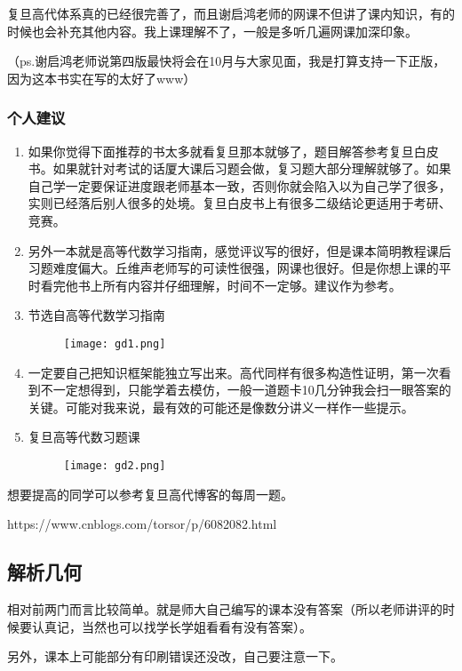 \documentclass{my_paper}
\begin{document}
复旦高代体系真的已经很完善了，而且谢启鸿老师的网课不但讲了课内知识，有的时候也会补充其他内容。我上课理解不了，一般是多听几遍网课加深印象。

（ps.谢启鸿老师说第四版最快将会在10月与大家见面，我是打算支持一下正版，因为这本书实在写的太好了www）

\subsubsection{个人建议}
\begin{enumerate}
    \item 如果你觉得下面推荐的书太多就看复旦那本就够了，题目解答参考复旦白皮书。如果就针对考试的话厦大课后习题会做，复习题大部分理解就够了。如果自己学一定要保证进度跟老师基本一致，否则你就会陷入以为自己学了很多，实则已经落后别人很多的处境。复旦白皮书上有很多二级结论更适用于考研、竞赛。
    \item 另外一本就是高等代数学习指南，感觉评议写的很好，但是课本简明教程课后习题难度偏大。丘维声老师写的可读性很强，网课也很好。但是你想上课的平时看完他书上所有内容并仔细理解，时间不一定够。建议作为参考。
    \item  节选自高等代数学习指南
    \begin{figure}[H]
	\centering
	\texttt{[image: gd1.png]}
    \end{figure} 
    \item 	一定要自己把知识框架能独立写出来。高代同样有很多构造性证明，第一次看到不一定想得到，只能学着去模仿，一般一道题卡10几分钟我会扫一眼答案的关键。可能对我来说，最有效的可能还是像数分讲义一样作一些提示。
    \item   复旦高等代数习题课
    \begin{figure}[H]
	\centering
	\texttt{[image: gd2.png]}
    \end{figure} 
\end{enumerate}

想要提高的同学可以参考复旦高代博客的每周一题。

https://www.cnblogs.com/torsor/p/6082082.html


\subsection{解析几何}
相对前两门而言比较简单。就是师大自己编写的课本没有答案（所以老师讲评的时候要认真记，当然也可以找学长学姐看看有没有答案）。

另外，课本上可能部分有印刷错误还没改，自己要注意一下。
\end{document}
